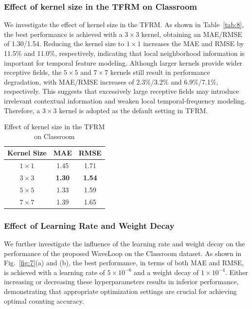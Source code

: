 \documentclass[lettersize,journal]{IEEEtran}
\begin{document}
\subsubsection{Effect of kernel size in the TFRM on Classroom}
We investigate the effect of kernel size in the TFRM. As shown in Table~\ref{tab:8}, the best performance is achieved with a $3\times3$ kernel, obtaining an MAE/RMSE of 1.30/1.54. Reducing the kernel size to $1\times1$ increases the MAE and RMSE by 11.5\% and 11.0\%, respectively, indicating that local neighborhood information is important for temporal feature modeling. Although larger kernels provide wider receptive fields, the $5\times5$ and $7\times7$ kernels still result in performance degradation, with MAE/RMSE increases of 2.3\%/3.2\% and 6.9\%/7.1\%, respectively. This suggests that excessively large receptive fields may introduce irrelevant contextual information and weaken local temporal-frequency modeling. Therefore, a $3\times3$ kernel is adopted as the default setting in TFRM.





\begin{table}[h]
\caption{Effect of kernel size in the TFRM on Classroom}
  \centering
  \scriptsize
    \begin{tabular}[]{ccc}
    \toprule
    Kernel Size & MAE & RMSE\\
    \midrule    
    $1\times1$ & 1.45 & 1.71\\
    $3\times3$ & \textbf{1.30} & \textbf{1.54}\\
    $5\times5$ & 1.33 & 1.59\\
    $7\times7$ & 1.39 & 1.65\\
    \bottomrule
    \end{tabular}
\label{tab:9}
\vspace{-1em}
\end{table}



\subsubsection{Effect of Learning Rate and Weight Decay}
We further investigate the influence of the learning rate and weight decay on the performance of the proposed WaveLoop on the Classroom dataset. As shown in Fig.~\ref{fig:7}(a) and (b), the best performance, in terms of both MAE and RMSE, is achieved with a learning rate of $5\times10^{-6}$ and a weight decay of $1\times10^{-4}$. Either increasing or decreasing these hyperparameters results in inferior performance, demonstrating that appropriate optimization settings are crucial for achieving optimal counting accuracy.
\end{document}
